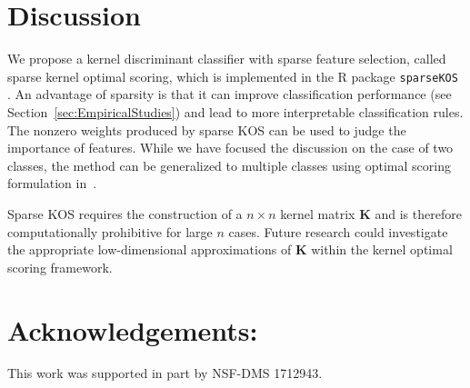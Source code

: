 \documentclass[twoside, onecolumn]{article}
\begin{document}



\section{Discussion}

We propose a kernel discriminant classifier with sparse feature selection, called sparse kernel optimal scoring, which is implemented in the R package \texttt{sparseKOS} \cite{sparseKOS}. An advantage of sparsity is that it can improve classification performance (see Section~\ref{sec:EmpiricalStudies}) and lead to more interpretable classification rules. The nonzero weights produced by sparse KOS can be used to judge the importance of features. While we have focused the discussion on the case of two classes, the method can be generalized to multiple classes using optimal scoring formulation in~\cite{gaynanova2018prediction}.

Sparse KOS requires the construction of a $n\times n$ kernel matrix $\mathbf{K}$ and is therefore computationally prohibitive for large $n$ cases. Future research could investigate the appropriate low-dimensional approximations of $\mathbf{K}$ within the kernel optimal scoring framework.

\vspace{0.05in}

\section*{Acknowledgements:} This work was supported in part by \uppercase{NSF-DMS} 1712943. 





  
\onecolumn 
\end{document}
